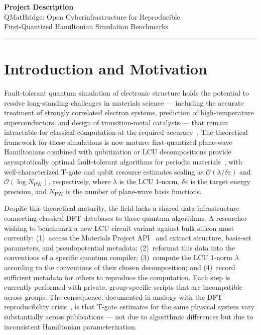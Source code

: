 \documentclass[11pt]{article}
\newcommand{\de}{\delta\varepsilon}
\begin{document}
\newpage
\setcounter{page}{1}

\begin{center}
  {\LARGE\bfseries\color{nsfblue} Project Description}\\[4pt]
  {\large QMatBridge: Open Cyberinfrastructure for Reproducible\\
  First-Quantized Hamiltonian Simulation Benchmarks}
\end{center}
\noindent\rule{\linewidth}{0.6pt}

\section{Introduction and Motivation}

Fault-tolerant quantum simulation of electronic structure holds the
potential to resolve long-standing challenges in materials science ---
including the accurate treatment of strongly correlated electron systems,
prediction of high-temperature superconductors, and design of transition-metal
catalysts --- that remain intractable for classical computation at the
required accuracy~\cite{Reiher2017,vonBurg2021,Goings2022}.
The theoretical framework for these simulations is now mature: first-quantized
plane-wave Hamiltonians combined with qubitization or LCU decompositions
provide asymptotically optimal fault-tolerant algorithms for periodic
materials~\cite{Babbush2019,Su2021,Lee2021}, with well-characterized
T-gate and qubit resource estimates scaling as $\mathcal{O}(\lambda/\de)$
and $\mathcal{O}(\log N_{\mathrm{PW}})$, respectively, where $\lambda$ is
the LCU 1-norm, $\de$ is the target energy precision, and
$N_{\mathrm{PW}}$ is the number of plane-wave basis functions.

Despite this theoretical maturity, the field lacks a shared data
infrastructure connecting classical DFT databases to these quantum algorithms.
A researcher wishing to benchmark a new LCU circuit variant against bulk
silicon must currently: (1)~access the Materials Project API~\cite{Jain2013}
and extract structure, basis-set parameters, and pseudopotential metadata;
(2)~reformat this data into the conventions of a specific quantum compiler;
(3)~compute the LCU 1-norm $\lambda$ according to the conventions of their
chosen decomposition; and (4)~record sufficient metadata for others to
reproduce the computation.
Each step is currently performed with private, group-specific scripts that
are incompatible across groups.
The consequence, documented in analogy with the DFT reproducibility
crisis~\cite{Lejaeghere2016}, is that T-gate estimates for the same physical
system vary substantially across publications --- not due to algorithmic
differences but due to inconsistent Hamiltonian parameterization.
\end{document}
